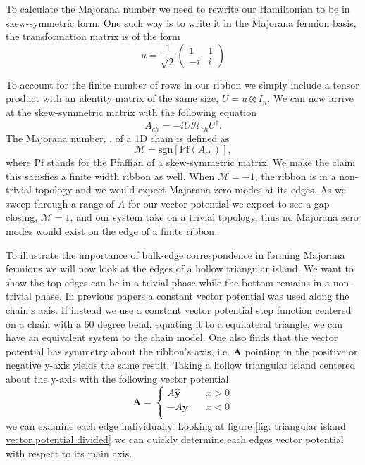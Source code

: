\documentclass[aps,prb,showpacs,amsmath,amssymb,superscriptaddress]{revtex4-2}
\let\oldhat\hat
\renewcommand{\hat}[1]{\oldhat{\mathbf{#1}}}
\renewcommand{\vec}[1]{\mathbf{#1}}
\newcommand{\Ham}{\mathcal{H}}
\begin{document}
To calculate the Majorana number we need to rewrite our Hamiltonian to be in skew-symmetric form.
One such way is to write it in the Majorana fermion basis, the transformation matrix is of the form
\begin{equation}
  u = \dfrac{1}{\sqrt{2}} \left(
  \begin{matrix}
    1 & 1 \\
    -i & i
  \end{matrix} \right)
\end{equation}

To account for the finite number of rows in our ribbon we simply include a tensor product with an identity matrix of the same size, $U = u \otimes I_n$.
We can now arrive at the skew-symmetric matrix with the following equation
\begin{equation}
  A_{ch} = -i U \Ham_{ch} U^{\dagger}.
\end{equation}
The Majorana number, , of a 1D chain is defined as
\begin{equation}
  \mathcal{M} = \text{sgn}[\text{Pf}(A_{ch})],
\end{equation}
where $\text{Pf}$ stands for the Pfaffian of a skew-symmetric matrix.
We make the claim this satisfies a finite width ribbon as well.
When $\mathcal{M} = -1$, the ribbon is in a non-trivial topology and we would expect Majorana zero modes at its edges.
As we sweep through a range of $A$ for our vector potential we expect to see a gap closing, $\mathcal{M} = 1$, and our system take on a trivial topology, thus no Majorana zero modes would exist on the edge of a finite ribbon.

To illustrate the importance of bulk-edge correspondence in forming Majorana fermions we will now look at the edges of a hollow triangular island.
We want to show the top edges can be in a trivial phase while the bottom remains in a non-trivial phase.
In previous papers a constant vector potential was used along the chain's axis.
If instead we use a constant vector potential step function centered on a chain with a 60 degree bend, equating it to a equilateral triangle, we can have an equivalent system to the chain model.
One also finds that the vector potential has symmetry about the ribbon's axis, i.e. $\vec{A}$ pointing in the positive or negative y-axis yields the same result.
Taking a hollow triangular island centered about the y-axis with the following vector potential
\begin{equation}
  \vec{A} = \begin{cases}
            A \hat{y} \quad &x > 0 \\
            -A \hat{y} \quad &x < 0 \\
            \end{cases}
\end{equation}
we can examine each edge individually.
Looking at figure \ref{fig: triangular island vector potential divided} we can quickly determine each edges vector potential with respect to its main axis.
\end{document}
